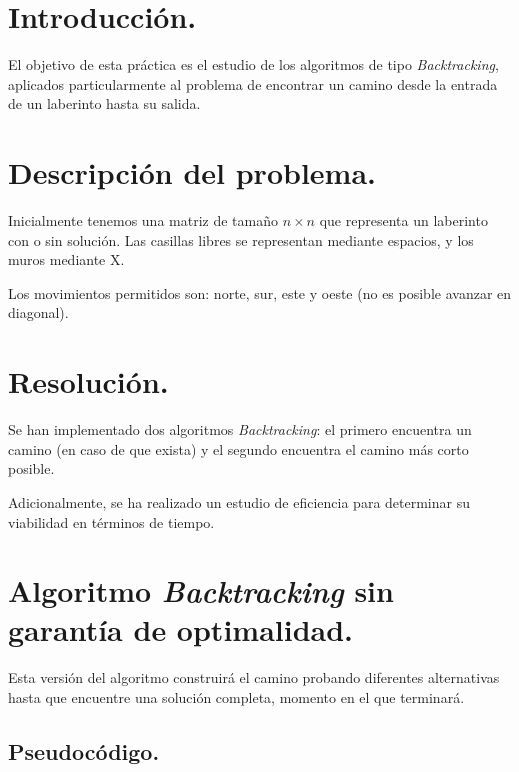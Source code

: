 \documentclass[11pt,a4paper]{article}
\begin{document}
	\section{Introducción.}

		\par
		El objetivo de esta práctica es el estudio de los algoritmos de tipo \textit{Backtracking}, aplicados particularmente al problema de encontrar un camino desde la entrada de un laberinto hasta su salida.

	\section{Descripción del problema.}

		\par
		Inicialmente tenemos una matriz de tamaño $n \times n$ que representa un laberinto con o sin solución. Las casillas libres se representan mediante espacios, y los muros mediante X.

		\par
		Los movimientos permitidos son: norte, sur, este y oeste (no es posible avanzar en diagonal).
	
	\section{Resolución.}

		\par
		Se han implementado dos algoritmos \textit{Backtracking}: el primero encuentra un camino (en caso de que exista) y el segundo encuentra el camino más corto posible.

		\par
		Adicionalmente, se ha realizado un estudio de eficiencia para determinar su viabilidad en términos de tiempo.

\newpage

	\section{Algoritmo \textit{Backtracking} sin garantía de optimalidad.}

		\par
		Esta versión del algoritmo construirá el camino probando diferentes alternativas hasta que encuentre una solución completa, momento en el que terminará.

		\subsection{Pseudocódigo.}
\end{document}
